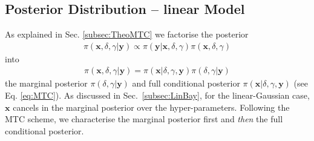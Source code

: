 \subsection{Posterior Distribution -- linear Model}
\label{sec:FirstO3Post}
As explained in Sec. \ref{subsec:TheoMTC} we factorise the posterior
\begin{align}
	\pi( \bm{x}, \delta, \gamma| \bm{y}) \propto \pi(\bm{y}| \bm{x},\delta,\gamma) \pi( \bm{x},  \delta,\gamma)
\end{align}
into 
\begin{align}
	\pi( \bm{x},  \delta,\gamma| \bm{y}) =\pi( \bm{x}| \delta,\gamma, \bm{y})\pi( \delta,\gamma | \bm{y})
\end{align}
the marginal posterior $\pi(\delta ,\gamma| \bm{y})$ and full conditional posterior $\pi( \bm{x}| \delta,\gamma, \bm{y})$ (see Eq. \ref{eq:MTC}).
As discussed in Sec.~\ref{subsec:LinBay}, for the linear-Gaussian case, $\bm{x}$ cancels in the marginal posterior over the hyper-parameters.
Following the MTC scheme, we characterise the marginal posterior first and \textit{then} the full conditional posterior.

